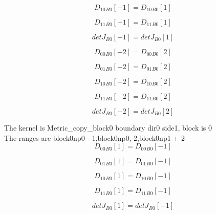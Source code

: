 \documentclass{article}
\begin{document}
\begin{dmath}{D_{10}{_{B0}}}[{-1}] = {D_{10}{_{B0}}}[{1}]\end{dmath}

\begin{dmath}{D_{11}{_{B0}}}[{-1}] = {D_{11}{_{B0}}}[{1}]\end{dmath}

\begin{dmath}{detJ{_{B0}}}[{-1}] = {detJ{_{B0}}}[{1}]\end{dmath}

\begin{dmath}{D_{00}{_{B0}}}[{-2}] = {D_{00}{_{B0}}}[{2}]\end{dmath}

\begin{dmath}{D_{01}{_{B0}}}[{-2}] = {D_{01}{_{B0}}}[{2}]\end{dmath}

\begin{dmath}{D_{10}{_{B0}}}[{-2}] = {D_{10}{_{B0}}}[{2}]\end{dmath}

\begin{dmath}{D_{11}{_{B0}}}[{-2}] = {D_{11}{_{B0}}}[{2}]\end{dmath}

\begin{dmath}{detJ{_{B0}}}[{-2}] = {detJ{_{B0}}}[{2}]\end{dmath}

\noindent The kernel is Metric_copy_block0 boundary dir0 side1, block is 0\\\noindent The ranges are block0np0 - 1,block0np0,-2,block0np1 + 2\\\begin{dmath}{D_{00}{_{B0}}}[{1}] = {D_{00}{_{B0}}}[{-1}]\end{dmath}

\begin{dmath}{D_{01}{_{B0}}}[{1}] = {D_{01}{_{B0}}}[{-1}]\end{dmath}

\begin{dmath}{D_{10}{_{B0}}}[{1}] = {D_{10}{_{B0}}}[{-1}]\end{dmath}

\begin{dmath}{D_{11}{_{B0}}}[{1}] = {D_{11}{_{B0}}}[{-1}]\end{dmath}

\begin{dmath}{detJ{_{B0}}}[{1}] = {detJ{_{B0}}}[{-1}]\end{dmath}
\end{document}
